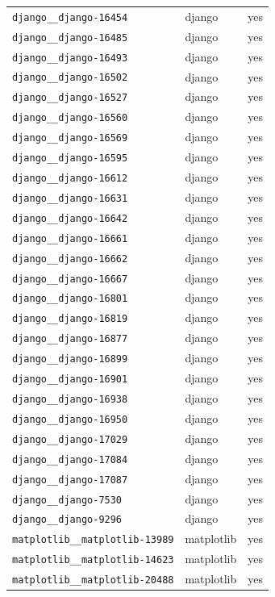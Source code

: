 \begin{longtable}{@{}p{}lp{}@{}}
\texttt{django\_\_django-16454} & django & yes \\
\texttt{django\_\_django-16485} & django & yes \\
\texttt{django\_\_django-16493} & django & yes \\
\texttt{django\_\_django-16502} & django & yes \\
\texttt{django\_\_django-16527} & django & yes \\
\texttt{django\_\_django-16560} & django & yes \\
\texttt{django\_\_django-16569} & django & yes \\
\texttt{django\_\_django-16595} & django & yes \\
\texttt{django\_\_django-16612} & django & yes \\
\texttt{django\_\_django-16631} & django & yes \\
\texttt{django\_\_django-16642} & django & yes \\
\texttt{django\_\_django-16661} & django & yes \\
\texttt{django\_\_django-16662} & django & yes \\
\texttt{django\_\_django-16667} & django & yes \\
\texttt{django\_\_django-16801} & django & yes \\
\texttt{django\_\_django-16819} & django & yes \\
\texttt{django\_\_django-16877} & django & yes \\
\texttt{django\_\_django-16899} & django & yes \\
\texttt{django\_\_django-16901} & django & yes \\
\texttt{django\_\_django-16938} & django & yes \\
\texttt{django\_\_django-16950} & django & yes \\
\texttt{django\_\_django-17029} & django & yes \\
\texttt{django\_\_django-17084} & django & yes \\
\texttt{django\_\_django-17087} & django & yes \\
\texttt{django\_\_django-7530} & django & yes \\
\texttt{django\_\_django-9296} & django & yes \\
\texttt{matplotlib\_\_matplotlib-13989} & matplotlib & yes \\
\texttt{matplotlib\_\_matplotlib-14623} & matplotlib & yes \\
\texttt{matplotlib\_\_matplotlib-20488} & matplotlib & yes \\

\end{longtable}
